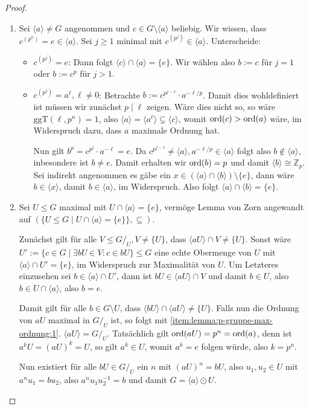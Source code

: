 \begin{proof}{\ }
    \begin{enumerate}
        \item Sei $\langle a \rangle \neq G$ angenommen und $c \in G \setminus \langle a \rangle$ beliebig. Wir wissen, dass $c^{(p^n)} = e \in \langle a \rangle$. Sei $j \geq 1$ minimal mit $c^{(p^j)} \in \langle a \rangle$. Unterscheide:
        \begin{itemize}
            \item $c^{(p^j)} = e$: Dann folgt $\langle c \rangle \cap \langle a \rangle = \{e\}$. Wir wählen also $b := c$ für $j = 1$ oder $b := c^p$ für $j > 1$.
            \item $c^{(p^j)} = a^\ell, \ell \neq 0$: Betrachte $b := c^{p^{j-1}} \cdot a^{-\ell / p}$. Damit dies wohldefiniert ist müssen wir zunächst $p \mid \ell$ zeigen. Wäre dies nicht so, so wäre $\mathrm{ggT}(\ell, p^n) = 1$, also $\langle a \rangle = \langle a^\ell \rangle \subsetneq \langle c \rangle$, womit $\operatorname{ord}(c) > \operatorname{ord}(a)$ wäre, im Widerspruch dazu, dass $a$ maximale Ordnung hat.
            
            Nun gilt $b^p = c^{p^j} \cdot a^{- \ell} = e$. Da $c^{p^{j-1}} \neq \langle a \rangle, a^{-\ell / p} \in \langle a \rangle$ folgt also $b \not\in \langle a \rangle$, inbesondere ist $b \neq e$. Damit erhalten wir $\operatorname{ord}(b) = p$ und damit $\langle b \rangle \cong \mathbb{Z}_p$. Sei indirekt angenommen es gäbe ein $x \in (\langle a \rangle \cap \langle b \rangle) \setminus \{e\}$, dann wäre $b \in \langle x \rangle$, damit $b \in \langle a \rangle$, im Widerspruch. Also folgt $\langle a \rangle \cap \langle b \rangle = \{e\}$.
        \end{itemize}

        \item Sei $U \leq G$ maximal mit $U \cap \langle a \rangle = \{e\}$, vermöge Lemma von Zorn angewandt auf $(\{ U \leq G \mid U \cap \langle a \rangle = \{e\} \}, \subseteq)$.
        
        Zunächst gilt für alle $V \leq G/_U, V \neq \{ U \}$, dass $\langle aU \rangle \cap V \neq \{ U \}$. Sonst wäre $U' := \{ c \in G \mid \exists b U \in V: c \in bU \} \leq G$ eine echte Obermenge von $U$ mit $\langle a \rangle \cap U' = \{e\}$, im Widerspruch zur Maximalität von $U$. Um Letzteres einzusehen sei $b \in \langle a \rangle \cap U'$, dann ist $bU \in \langle aU \rangle \cap V$ und damit $b \in U$, also $b \in U \cap \langle a \rangle$, also $b = e$. 
        
        Damit gilt für alle $b \in G \setminus U$, dass $\langle bU \rangle \cap \langle aU \rangle \neq \{ U \}$. Falls nun die Ordnung von $aU$ maximal in $G/_U$ ist, so folgt mit \ref*{item:lemma:p-gruppe-max-ordnung:1}. $\langle a U \rangle = G/_U$. Tatsächlich gilt $\operatorname{ord}(aU) = p^n = \operatorname{ord}(a)$, denn ist $a^k U = (aU)^k = U$, so gilt $a^k \in U$, womit $a^k = e$ folgen würde, also $k = p^n$.

        Nun existiert für alle $bU \in G/_U$ ein $n$ mit $(aU)^n = bU$, also $u_1, u_2 \in U$ mit $a^n u_1 = b u_2$, also $a^n u_1 u_2^{-1} = b$ und damit $G = \langle a \rangle \odot U$.
    \end{enumerate}
\end{proof}

